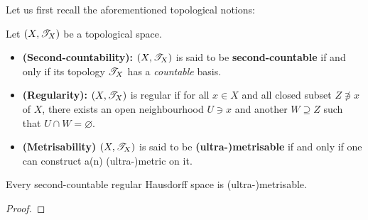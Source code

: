             Let us first recall the aforementioned topological notions:
            \begin{definition}
                Let $(X, \mathscr{T}_X)$ be a topological space.
                    \begin{itemize}
                        \item \textbf{(Second-countability):} $(X, \mathscr{T}_X)$ is said to be \textbf{second-countable} if and only if its topology $\mathscr{T}_X$ has a \textit{countable} basis.
                        \item \textbf{(Regularity):} $(X, \mathscr{T}_X)$ is regular if for all $x \in X$ and all closed subset $Z \not \ni x$ of $X$, there exists an open neighbourhood $U \ni x$ and another $W \supseteq Z$ such that $U \cap W = \varnothing$.
                        \item \textbf{(Metrisability)} $(X, \mathscr{T}_X)$ is said to be \textbf{(ultra-)metrisable} if and only if one can construct a(n) (ultra-)metric on it.
                    \end{itemize}
            \end{definition}
            \begin{theorem} \label{theorem: urysohn_metrisation_theorem}
                Every second-countable regular Hausdorff space is (ultra-)metrisable.
            \end{theorem}
                \begin{proof}
                    
                \end{proof}
            
